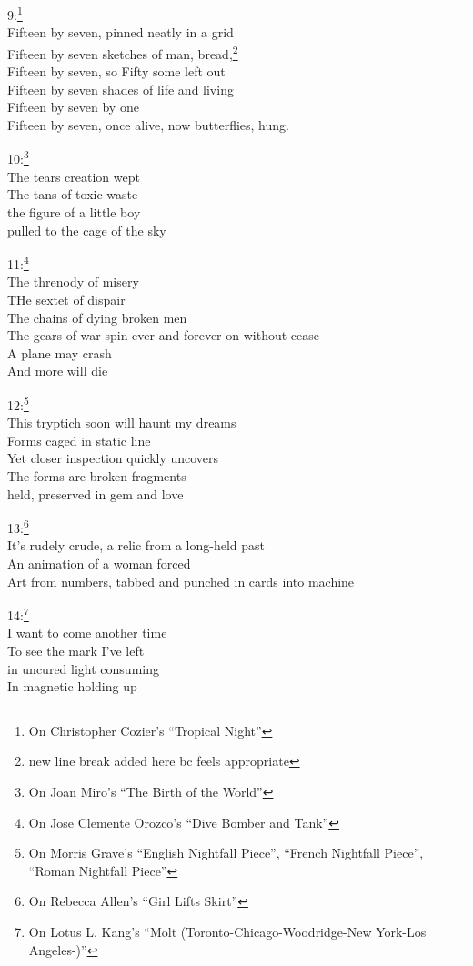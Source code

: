 \documentclass[12pt]{article}
\newcommand{\say}[1]{``#1''}
\renewcommand{\,}{\textsuperscript{,}}
\begin{document}
9:\footnote{On Christopher Cozier's \say{Tropical Night}}\\
Fifteen by seven, pinned neatly in a grid\\
Fifteen by seven sketches of man, bread,\footnote{new line break added here bc feels appropriate}\\
Fifteen by seven, so Fifty some left out\\
Fifteen by seven shades of life and living\\
Fifteen by seven by one\\
Fifteen by seven, once alive, now butterflies, hung.

10:\footnote{On Joan Miro's \say{The Birth of the World}}\\
The tears creation wept\\
The tans of toxic waste\\
the figure of a little boy\\
pulled to the cage of the sky

11:\footnote{On Jose Clemente Orozco's \say{Dive Bomber and Tank}}\\
The threnody of misery\\
THe sextet of dispair\\
The chains of dying broken men\\
The gears of war spin ever and forever on without cease\\
A plane may crash\\
And more will die

12:\footnote{On Morris Grave's \say{English Nightfall Piece}, \say{French Nightfall Piece}, \say{Roman Nightfall Piece}}\\
This tryptich soon will haunt my dreams\\
Forms caged in static line\\
Yet closer inspection quickly uncovers\\
The forms are broken fragments\\
held, preserved in gem and love

13:\footnote{On Rebecca Allen's \say{Girl Lifts Skirt}}\\
It's rudely crude, a relic from a long-held past\\
An animation of a woman forced\\
Art from numbers, tabbed and punched in cards into machine

14:\footnote{On Lotus L. Kang's \say{Molt (Toronto-Chicago-Woodridge-New York-Los Angeles-)}}\\
I want to come another time\\
To see the mark I've left\\
in uncured light consuming\\
In magnetic holding up
\end{document}
